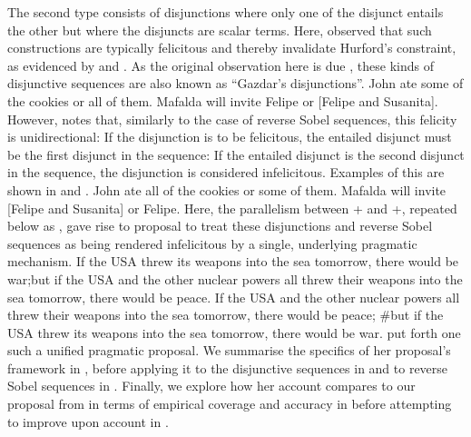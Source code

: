 The second type consists of disjunctions where only one of the disjunct entails the other but where the disjuncts are scalar terms. Here, \textcite{Gazdar1979} observed that such constructions are typically felicitous and thereby invalidate Hurford's constraint, as evidenced by  and . As the original observation here is due \textcite{Gazdar1979}, these kinds of disjunctive sequences are also known as \enquote{Gazdar's disjunctions}.
\pex[nopreamble=true]\label{ex:scalardisjunction-good}
\a{} John ate some of the cookies or all of them.
\a{} Mafalda will invite Felipe or [Felipe and Susanita].
\xe
However, \textcite{Singh2008} notes that, similarly to the case of reverse Sobel sequences, this felicity is unidirectional: If the disjunction is to be felicitous, the entailed disjunct must be the first disjunct in the sequence: If the entailed disjunct is the second disjunct in the sequence, the disjunction is considered infelicitous. Examples of this are shown in  and .
\pex[nopreamble=true]\label{ex:scalardisjunction-bad}
\a{}\ljudge{\#}John ate all of the cookies or some of them.
\a{}\ljudge{\#}Mafalda will invite [Felipe and Susanita] or Felipe.
\xe
Here, the parallelism between + and +, repeated below as , gave rise to  proposal to treat these disjunctions and reverse Sobel sequences as being rendered infelicitous by a single, underlying pragmatic mechanism.
\pex[nopreamble=true]\label{ex:yetanotherusrss}
\a{}If the USA threw its weapons into the sea tomorrow, there would be war;\linebreak but if the USA and the other nuclear powers all threw their weapons into the sea tomorrow, there would be peace.\hfill\parencite[p. 10]{Lewis1973}
\a{}If the USA and the other nuclear powers all threw their weapons into the sea tomorrow, there would be peace; \#but if the USA threw its weapons into the sea tomorrow, there would be war.\hfill\parencite{Heim1994}
\xe
\textcite{Ippolito2020} put forth one such a unified pragmatic proposal. We summarise the specifics of her proposal's framework in , before applying it to the disjunctive sequences in  and to reverse Sobel sequences in . Finally, we explore how her account compares to our proposal from  in terms of empirical coverage and accuracy in  before attempting to improve upon  account in .

